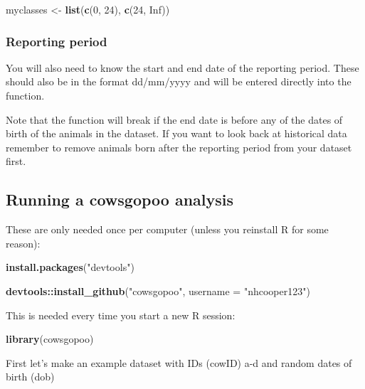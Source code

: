 \documentclass[12pt]{article}
\newcommand{\KeywordTok}[1]{\textcolor[rgb]{0.13,0.29,0.53}{\textbf{{#1}}}}
\newcommand{\DataTypeTok}[1]{\textcolor[rgb]{0.13,0.29,0.53}{{#1}}}
\newcommand{\DecValTok}[1]{\textcolor[rgb]{0.00,0.00,0.81}{{#1}}}
\newcommand{\CharTok}[1]{\textcolor[rgb]{0.31,0.60,0.02}{{#1}}}
\newcommand{\StringTok}[1]{\textcolor[rgb]{0.31,0.60,0.02}{{#1}}}
\newcommand{\NormalTok}[1]{{#1}}
\begin{document}
\begin{snugshade}
\begin{Highlighting}[]
\NormalTok{myclasses <-}\StringTok{ }\KeywordTok{list}\NormalTok{(}\KeywordTok{c}\NormalTok{(}\DecValTok{0}\NormalTok{,} \DecValTok{24}\NormalTok{),} \KeywordTok{c}\NormalTok{(}\DecValTok{24}\NormalTok{,} \CharTok{Inf}\NormalTok{))}
\end{Highlighting}
\end{snugshade}

\subsubsection{Reporting period}
You will also need to know the start and end date of the reporting period. These should also be in the format dd/mm/yyyy and will be entered directly into the function. 

\begin{framed}
Note that the function will break if the end date is before any of the dates of birth of the animals in the dataset. If you want to look back at historical data remember to remove animals born after the reporting period from your dataset first.
\end{framed}

\subsection{Running a cowsgopoo analysis}

These are only needed once per computer (unless you reinstall R for some reason):
\begin{snugshade}
\begin{Highlighting}[]
\KeywordTok{install.packages}\NormalTok{(}\StringTok{"devtools"}\NormalTok{)}

\KeywordTok{devtools::install_github}\NormalTok{(}\StringTok{"cowsgopoo"}\NormalTok{,} \DataTypeTok{username = }\StringTok{"nhcooper123"}\NormalTok{)}
\end{Highlighting}
\end{snugshade}

This is needed every time you start a new R session:
\begin{snugshade}
\begin{Highlighting}[]
\KeywordTok{library}\NormalTok{(cowsgopoo)}
\end{Highlighting}
\end{snugshade}

First let's make an example dataset with IDs (cowID) a-d and random dates of birth (dob)
\end{document}
